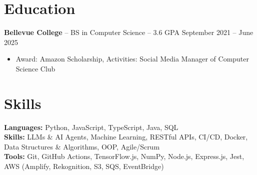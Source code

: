 \documentclass[11pt]{article}
\begin{document}

\vspace{-18.5pt}

\section*{Education}
\textbf{Bellevue College} -- BS in Computer Science -- 3.6 GPA \hfill September 2021 -- June 2025\\
\vspace{-9pt}
\begin{itemize}
  \item Award: Amazon Scholarship, Activities: Social Media Manager of Computer Science Club
\end{itemize}

\vspace{-18.5pt}

\section*{Skills}
\textbf{Languages:} Python, JavaScript, TypeScript, Java, SQL\\
\textbf{Skills:} LLMs \& AI Agents, Machine Learning, RESTful APIs, CI/CD, Docker, Data Structures \& Algorithms, OOP, Agile/Scrum\\
\textbf{Tools:} Git, GitHub Actions, TensorFlow.js, NumPy, Node.js, Express.js, Jest, AWS (Amplify, Rekognition, S3, SQS, EventBridge)

\vspace{-6.5pt}
\end{document}
